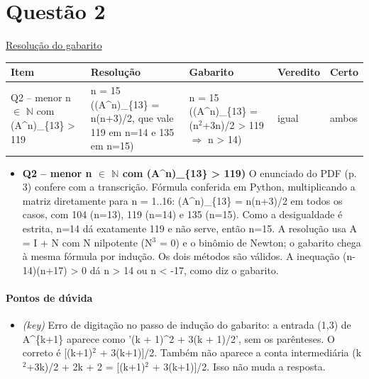 \documentclass{article}%
\begin{document}
\section*{Questão 2}%
\href{https://poliedroresolve.sistemapoliedro.com.br/vestibulares/ita/2026/ita-2-fase-dia-1-28-10-2025-2-fase-dia-1/dissertativa-2-matematica-2-fase-dia-1-ita-2026}{Resolução do gabarito}\par\smallskip%
\begin{longtable}{@{}p{} p{} p{} p{} p{}@{}}\toprule Item & Resolução & Gabarito & Veredito & Certo \\ \midrule
Q2 -- menor n $\in$ $\mathbb{N}$ com (A\^{}n)\_\{13\} > 119 & n = 15 ((A\^{}n)\_\{13\} = n(n+3)/2, que vale 119 em n=14 e 135 em n=15) & n = 15 ((A\^{}n)\_\{13\} = (n$^2$+3n)/2 > 119 $\Rightarrow$ n > 14) & igual & ambos \\
\bottomrule\end{longtable}%
\begin{itemize}%
\item%
\textbf{Q2 -- menor n $\in$ $\mathbb{N}$ com (A\^{}n)\_\{13\} > 119)} O enunciado do PDF (p. 3) confere com a transcrição. Fórmula conferida em Python, multiplicando a matriz diretamente para n = 1..16: (A\^{}n)\_\{13\} = n(n+3)/2 em todos os casos, com 104 (n=13), 119 (n=14) e 135 (n=15). Como a desigualdade é estrita, n=14 dá exatamente 119 e não serve, então n=15. A resolução usa A = I + N com N nilpotente (N$^3$ = 0) e o binômio de Newton; o gabarito chega à mesma fórmula por indução. Os dois métodos são válidos. A inequação (n-14)(n+17) > 0 dá n > 14 ou n < -17, como diz o gabarito.%
\end{itemize}%
\paragraph{Pontos de dúvida}%
\begin{itemize}%
\item%
\textit{(key)} Erro de digitação no passo de indução do gabarito: a entrada (1,3) de A\^{}\{k+1\} aparece como '(k + 1)\^{}2 + 3(k + 1)/2', sem os parênteses. O correto é {[}(k+1)$^2$ + 3(k+1){]}/2. Também não aparece a conta intermediária (k$^2$+3k)/2 + 2k + 2 = {[}(k+1)$^2$ + 3(k+1){]}/2. Isso não muda a resposta.%
\end{itemize}%
\end{document}
